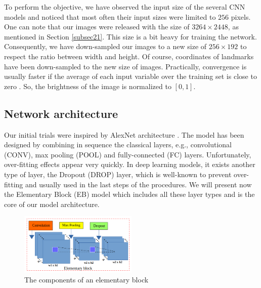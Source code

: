 \documentclass[review]{elsarticle}
\begin{document}
To perform the objective, we have observed the input size of the several CNN models \cite{krizhevsky2012imagenet, ciregan2012multi, cintas2016automatic, sun2013deep} and noticed that most often their input sizes were limited to $256$ pixels. One can note that our images were released with the size of $3264 \times 2448$, as mentioned in Section \ref{subsec21}. This size is a bit heavy for training the network. Consequently, we have down-sampled our images to a new size of $256 \times 192$ to respect the ratio between width and height. Of course, coordinates of landmarks have been down-sampled to the new size of images. Practically, convergence is usually faster if the average of each input variable over the training set is close to zero \cite{lecun2012efficient}. So, the brightness of the image is normalized to $[0,1]$.%

\subsection{Network architecture}
\label{subsec22}
Our initial trials were inspired by AlexNet architecture
\cite{krizhevsky2012imagenet}. The model has been designed by
combining in sequence the classical layers, e.g., convolutional
(CONV), max pooling (POOL) and fully-connected (FC)
layers. Unfortunately, over-fitting effects appear very
quickly. In deep learning models, it exists another type of layer, the
Dropout (DROP) layer, which is well-known to prevent
over-fitting \cite{srivastava2014dropout} and usually used in the last steps of the procedures. We
will present now the Elementary Block (EB) model which includes all
these layer types and is the core of our model
architecture.


\begin{figure}[h!]
	\centering
	\includegraphics[width=0.5\textwidth]{images/eblock}
	\caption{The components of an elementary block}
	\label{figeblock}
\end{figure}
\end{document}
